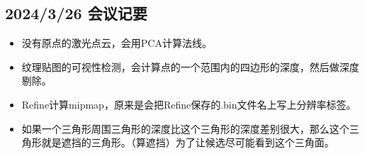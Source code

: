 \subsection{2024/3/26 会议记要}

\begin{itemize}
    \item 没有原点的激光点云，会用PCA计算法线。
    \item 纹理贴图的可视性检测，会计算点的一个范围内的四边形的深度，然后做深度剔除。
    \item Refine计算mipmap，原来是会把Refine保存的.bin文件名上写上分辨率标签。
    \item 如果一个三角形周围三角形的深度比这个三角形的深度差别很大，那么这个三角形就是遮挡的三角形。（算遮挡）为了让候选尽可能看到这个三角面。
\end{itemize}